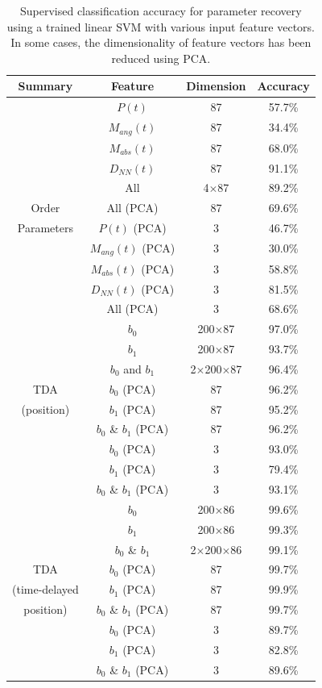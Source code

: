 \documentclass[%
 aip,
reprint,
 amsmath,amssymb,
 aps,
showkeys
]{revtex4-1}
\begin{document}
\begin{table}[]
    \centering
    \begin{tabular}{|c|c|c|c|}
    \hline
    \textbf{Summary} & \textbf{Feature}  & \textbf{Dimension}  & \textbf{Accuracy}  \\ \hline \hline
          & $P(t)$ & 87 & 57.7\%\\
          & $M_{ang}(t)$ & 87 & 34.4\%\\
          & $M_{abs}(t)$ & 87 & 68.0\%\\
          & $D_{NN}(t)$ & 87 & 91.1\%\\
          & All & 4$\times$87 & 89.2\% \\
  Order        & All (PCA) & 87 & 69.6\% \\
Parameters     & $P(t)$ (PCA) & 3 & 46.7\%\\
          & $M_{ang}(t)$ (PCA) & 3 & 30.0\%\\
          & $M_{abs}(t)$ (PCA) & 3 & 58.8\%\\
          & $D_{NN}(t)$ (PCA) & 3 & 81.5\%\\
          & All (PCA) & 3 & 68.6\% \\ 
          
          \hline
          & $b_0$ & 200$\times$87 & 97.0\% \\
          & $b_1$& 200$\times$87 & 93.7\%\\
          & $b_0$ and $b_1$ & 2$\times$200$\times$87 & 96.4\%\\
          TDA & $b_0$ (PCA) & 87& 96.2\%\\
          (position) & $b_1$ (PCA) & 87& 95.2\%\\
          & $b_0$ \& $b_1$ (PCA) & 87 & 96.2\%\\ 
          & $b_0$ (PCA) & 3 & 93.0\%\\
          & $b_1$ (PCA) & 3& 79.4\%\\
          & $b_0$ \& $b_1$ (PCA) & 3& 93.1\%\\ 
          \hline
          & $b_0$ & 200$\times$86& 99.6\%\\
          & $b_1$& 200$\times$86 & 99.3\%\\
          & $b_0$ \& $b_1$ & 2$\times$200$\times$86 & 99.1\%\\
          TDA & $b_0$ (PCA) & 87 & 99.7\%\\
          (time-delayed & $b_1$ (PCA) & 87 & 99.9\%\\
           position) & $b_0$ \& $b_1$ (PCA) & 87 & 99.7\%\\ 
          & $b_0$ (PCA) & 3 & 89.7\%\\
          & $b_1$ (PCA) & 3 & 82.8\%\\
          & $b_0$ \& $b_1$ (PCA) & 3 & 89.6\%\\ 
          \hline
          
     \hline
    \end{tabular}
    \caption{Supervised classification accuracy for parameter recovery using a trained linear SVM with various input feature vectors. In some cases, the dimensionality of feature vectors has been reduced using PCA.}
    \label{tab:supervised_results}
\end{table}
\end{document}
